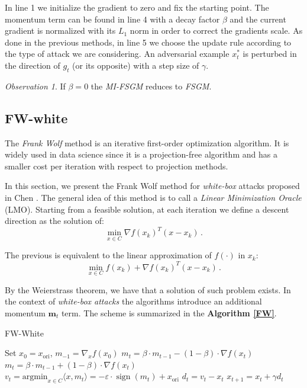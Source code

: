 \documentclass[10pt,twocolumn,letterpaper, english]{article}
\newcommand{\sign}{\mathop{\mathrm{sign}}}
\theoremstyle{definition}
\theoremstyle{plain}
\theoremstyle{plain}
\theoremstyle{plain}
\theoremstyle{plain}
\theoremstyle{remark}
\newtheorem{osservazione}{Observation}[section]
\theoremstyle{remark}
\theoremstyle{definition}
\theoremstyle{definition}
\theoremstyle{definition}
\theoremstyle{definition}
\renewcommand{\epsilon}{\varepsilon}
\begin{document}
In line 1 we initialize the gradient to zero and fix the starting point.
The momentum term can be found in line 4 with a decay factor $\beta$ and the current gradient is normalized with its $L_1$ norm in order to correct the gradients scale.
As done in the previous methods, in line 5 we choose the update rule according to the type of attack we are considering.
An adversarial example $x_{t}^{\ast}$ is perturbed in the direction of $g_t$ (or its opposite) with a step size of $\gamma$. 


\begin{osservazione}
If $\beta = 0$ the \textit{MI-FSGM} reduces to \textit{FSGM}.
\end{osservazione}


\subsection{FW-white}

The \textit{Frank Wolf} method is an iterative first-order optimization algorithm. 
It is widely used in data science since it is a projection-free algorithm and has a smaller cost per iteration with respect to projection methods.

In this section, we present the Frank Wolf method for \textit{white-box} attacks proposed in Chen \cite{frank}. 
The general idea of this method is to call a \textit{Linear Minimization Oracle} (LMO). 
Starting from a feasible solution, at each iteration we define a descent direction as the solution of:
\begin{equation*}
    \min_{x \in C}\nabla f(x_k)^T (x-x_k)\,.
\end{equation*}

The previous is equivalent to the linear approximation of $f(\cdot)$ in $x_k$:
\begin{equation*}
    \min_{x \in C} f(x_k) + \nabla f(x_k)^T (x-x_k)\,.
\end{equation*}

By the Weierstrass theorem, we have that a solution of such problem exists.
In the context of \textit{white-box attacks} the algorithms introduce an additional momentum $\textbf{m}_t$ term. 
The scheme is summarized in the \textbf{Algorithm \ref{FW}}.

\begin{algorithm}
\caption{FW-White}\label{FW}
\begin{algorithmic}[1]

\State Set $x_0 = x_{\text{ori}}$, $m_{-1} = \nabla_x f(x_0)$
    \State $m_t = \beta \cdot m_{t-1} - (1-\beta) \cdot \nabla f(x_t) $ 
    \State $m_t = \beta \cdot m_{t-1} + (1-\beta) \cdot \nabla f(x_t) $ 
    \State $v_t = \text{argmin}_{x \in C} \langle x, m_t \rangle = - \epsilon \cdot \sign (m_t) + x_{\text{ori}} $
    \State $d_t = v_t - x_t $
    \State $x_{t+1} = x_t + \gamma d_t $
    
\EndFor
\end{algorithmic}
\end{algorithm}
\end{document}
